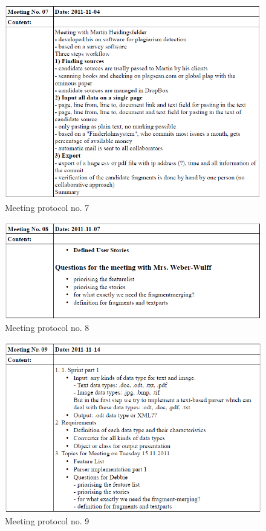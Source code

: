 \begin{appendix}
\begin{figure}
  \centering
    \includegraphics[width=\textwidth]{images/a_meetings/meeting_07.png}
  \caption{Meeting protocol no. 7}
  \label{fig:meeting protocol no. 7}
\end{figure}

\begin{figure}
  \centering
    \includegraphics[width=\textwidth]{images/a_meetings/meeting_08.png}
  \caption{Meeting protocol no. 8}
  \label{fig:meeting protocol no. 8}
\end{figure}

\begin{figure}
  \centering
    \includegraphics[width=\textwidth]{images/a_meetings/meeting_09.png}
  \caption{Meeting protocol no. 9}
  \label{fig:meeting protocol no. 9}
\end{figure}


\end{appendix}
